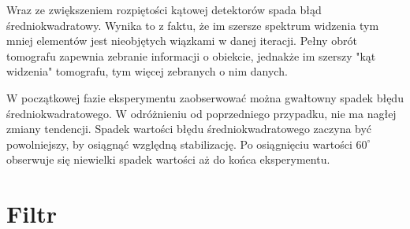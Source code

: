 \documentclass{article}
\begin{document}
Wraz ze zwiększeniem rozpiętości kątowej detektorów spada błąd średniokwadratowy. Wynika to z  faktu, że im szersze spektrum widzenia tym mniej elementów jest nieobjętych wiązkami w danej iteracji. Pełny obrót tomografu zapewnia zebranie informacji o obiekcie, jednakże im szerszy "kąt widzenia" tomografu, tym więcej zebranych o nim danych.

W początkowej fazie eksperymentu zaobserwować można gwałtowny spadek błędu średniokwadratowego. W odróżnieniu od poprzedniego przypadku, nie ma nagłej zmiany tendencji. Spadek wartości błędu średniokwadratowego zaczyna być powolniejszy, by osiągnąć względną stabilizację. Po osiągnięciu wartości $60^{\circ}$ obserwuje się niewielki spadek wartości aż do końca eksperymentu.

\section{Filtr}




\end{document}
